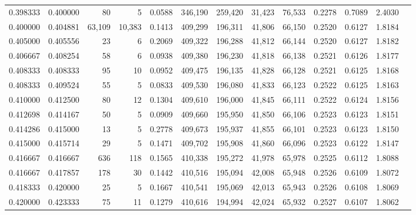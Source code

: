 \begin{tabular}{rrrrrrrrrrrrr}
0.398333 & 0.400000 &     80 &      5 &                                     0.0588 & 346,190 & 259,420 &  31,423 &  76,533 & 0.2278 & 0.7089 & 2.4030 \\
0.400000 & 0.404881 & 63,109 & 10,383 &                                     0.1413 & 409,299 & 196,311 &  41,806 &  66,150 & 0.2520 & 0.6127 & 1.8184 \\
0.405000 & 0.405556 &     23 &      6 &                                     0.2069 & 409,322 & 196,288 &  41,812 &  66,144 & 0.2520 & 0.6127 & 1.8182 \\
0.406667 & 0.408254 &     58 &      6 &                                     0.0938 & 409,380 & 196,230 &  41,818 &  66,138 & 0.2521 & 0.6126 & 1.8177 \\
0.408333 & 0.408333 &     95 &     10 &                                     0.0952 & 409,475 & 196,135 &  41,828 &  66,128 & 0.2521 & 0.6125 & 1.8168 \\
0.408333 & 0.409524 &     55 &      5 &                                     0.0833 & 409,530 & 196,080 &  41,833 &  66,123 & 0.2522 & 0.6125 & 1.8163 \\
0.410000 & 0.412500 &     80 &     12 &                                     0.1304 & 409,610 & 196,000 &  41,845 &  66,111 & 0.2522 & 0.6124 & 1.8156 \\
0.412698 & 0.414167 &     50 &      5 &                                     0.0909 & 409,660 & 195,950 &  41,850 &  66,106 & 0.2523 & 0.6123 & 1.8151 \\
0.414286 & 0.415000 &     13 &      5 &                                     0.2778 & 409,673 & 195,937 &  41,855 &  66,101 & 0.2523 & 0.6123 & 1.8150 \\
0.415000 & 0.415714 &     29 &      5 &                                     0.1471 & 409,702 & 195,908 &  41,860 &  66,096 & 0.2523 & 0.6122 & 1.8147 \\
0.416667 & 0.416667 &    636 &    118 &                                     0.1565 & 410,338 & 195,272 &  41,978 &  65,978 & 0.2525 & 0.6112 & 1.8088 \\
0.416667 & 0.417857 &    178 &     30 &                                     0.1442 & 410,516 & 195,094 &  42,008 &  65,948 & 0.2526 & 0.6109 & 1.8072 \\
0.418333 & 0.420000 &     25 &      5 &                                     0.1667 & 410,541 & 195,069 &  42,013 &  65,943 & 0.2526 & 0.6108 & 1.8069 \\
0.420000 & 0.423333 &     75 &     11 &                                     0.1279 & 410,616 & 194,994 &  42,024 &  65,932 & 0.2527 & 0.6107 & 1.8062 \\

\end{tabular}
